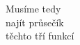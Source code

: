 \documentclass[preview]{standalone}
\begin{document}
\begin{center}
Musíme tedy\\najít průsečík\\těchto tří funkcí
\end{center}
\end{document}
